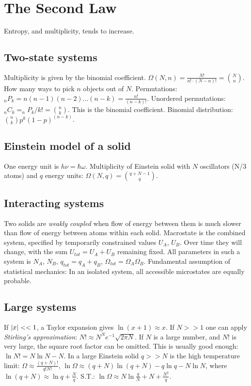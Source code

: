\documentclass[11pt,twocolumn]{amsart}
\begin{document}
\section{The Second Law}
Entropy, and multiplicity, tends to increase.
\subsection{Two-state systems} 
Multiplicity is given by the binomial coefficient. $\Omega(N,n) = \frac{N!}{n!\cdot (N-n)! } = \binom{N}{n}$. How many ways to pick $n$ objects out of $N$. Permutations: $_nP_k = n(n-1)(n-2)\dots (n-k) = \frac{n!}{(n-k)!} $. Unordered permutations: $_nC_k = _nP_k / k! = \binom{n}{k}$. This is the binomial coefficient. Binomial distribution: $\binom{n}{k}p^k(1-p)^{(n-k)}$.
\subsection{Einstein model of a solid} 
One energy unit is $h\nu = \hbar\omega$. Multiplicity of Einstein solid with $N$ oscillators (N/3 atoms) and $q$ energy units: $\Omega(N,q) = \binom{q+N-1}{q}$.
\subsection{Interacting systems}
Two solids are \emph{weakly coupled} when flow of energy between them is much slower than flow of energy between atoms within each solid. Macrostate is the combined system, specified by temporarily constrained values $U_A$, $U_B$. Over time they will change, with the sum $U_{tot} = U_A + U_B$ remaining fixed. All parameters in such a system is $N_A$, $N_B$, $q_{tot}=q_A+q_B$, $\Omega_{tot}=\Omega_A \Omega_B$. Fundamental assumption of statistical mechanics: In an isolated system, all accessible microstates are equally probable.
\subsection{Large systems}
If $\abs{x} << 1$, a Taylor expansion gives $\ln(x+1)\approx x$. If $N >> 1$ one can apply \emph{Stirling's approximation}: $N! \approx N^Ne^{-1}\sqrt{2\pi N}$. If $N$ is a large number, and $N!$ is very large, the square root factor can be omitted. This is usually good enough: $\ln N! = N\ln N - N$. In a large Einstein solid $q>>N$ is the high temperature limit: $\Omega \approx \frac{(q+N)!}{q!N!}$, $\ln\Omega \approx (q+N)\ln(q+N) - q\ln q - N\ln N$, where $\ln(q+N) \approx \ln q + \frac{N}{q}$. S.T.: $\ln\Omega \approx N\ln \frac{q}{N} + N + \frac{N^2}{q}$.
\end{document}
